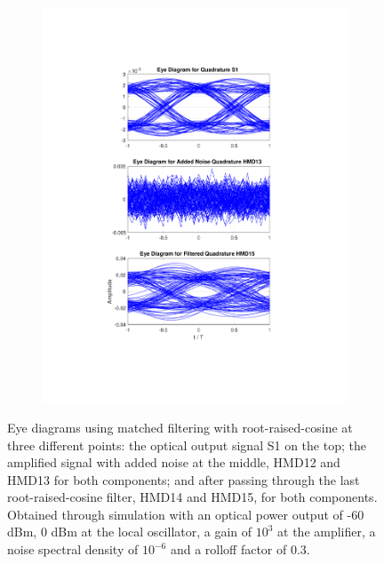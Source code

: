 \begin{figure}[H]
\begin{subfigure}{.45\textwidth}
		\includegraphics[clip, trim=5cm 4cm 5cm 4cm, width=\textwidth]{./sdf/m_qam_system/figures/eyes/q_p_60_03.pdf}
	\end{subfigure}

	\caption{Eye diagrams using matched filtering with root-raised-cosine at three different points: the optical output signal S1 on the top; the amplified signal with added noise at the middle, HMD12 and HMD13 for both components; and after passing through the last root-raised-cosine filter, HMD14 and HMD15, for both components. Obtained through simulation with an optical power output of -60 dBm, 0 dBm at the local oscillator, a gain of $10^3$ at the amplifier, a noise spectral density of $10^{-6}$ and a rolloff factor of 0.3.\label{fig:eyes_n_rrc_60_03}}
	
\end{figure}

